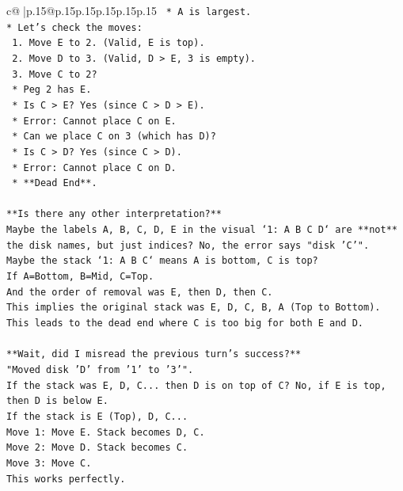 \documentclass{article}
\begin{document}
{\begin{supertabular}{c@{$\;$}|p{.15\linewidth}@{}p{.15\linewidth}p{.15\linewidth}p{.15\linewidth}p{.15\linewidth}p{.15\linewidth}}
{{{\texttt{    *   A is largest.} \\
\texttt{*   Let's check the moves:} \\
\texttt{    1.  Move E to 2. (Valid, E is top).} \\
\texttt{    2.  Move D to 3. (Valid, D > E, 3 is empty).} \\
\texttt{    3.  Move C to 2?} \\
\texttt{        *   Peg 2 has E.} \\
\texttt{        *   Is C > E? Yes (since C > D > E).} \\
\texttt{        *   Error: Cannot place C on E.} \\
\texttt{        *   Can we place C on 3 (which has D)?} \\
\texttt{        *   Is C > D? Yes (since C > D).} \\
\texttt{        *   Error: Cannot place C on D.} \\
\texttt{    *   **Dead End**.} \\
\\ 
\texttt{**Is there any other interpretation?**} \\
\texttt{Maybe the labels A, B, C, D, E in the visual `1: A B C D` are **not** the disk names, but just indices? No, the error says "disk 'C'".} \\
\texttt{Maybe the stack `1: A B C` means A is bottom, C is top?} \\
\texttt{If A=Bottom, B=Mid, C=Top.} \\
\texttt{And the order of removal was E, then D, then C.} \\
\texttt{This implies the original stack was E, D, C, B, A (Top to Bottom).} \\
\texttt{This leads to the dead end where C is too big for both E and D.} \\
\\ 
\texttt{**Wait, did I misread the previous turn's success?**} \\
\texttt{"Moved disk 'D' from '1' to '3'".} \\
\texttt{If the stack was E, D, C... then D is on top of C? No, if E is top, then D is below E.} \\
\texttt{If the stack is E (Top), D, C...} \\
\texttt{Move 1: Move E. Stack becomes D, C.} \\
\texttt{Move 2: Move D. Stack becomes C.} \\
\texttt{Move 3: Move C.} \\
\texttt{This works perfectly.} \\
}}}
\end{supertabular}}
\end{document}
